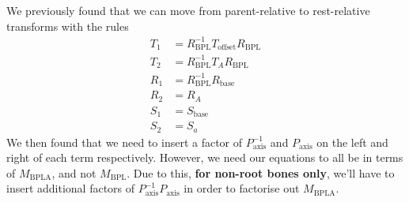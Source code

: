 \documentclass{article}
\begin{document}
We previously found that we can move from parent-relative to rest-relative transforms with the rules
\begin{align}
T_1 &= R_\mathrm{BPL}^{-1} T_\mathrm{offset} R_\mathrm{BPL}\\
T_2 &= R_\mathrm{BPL}^{-1} T_A R_\mathrm{BPL}\\
R_1 &= R_\mathrm{BPL}^{-1} R_\mathrm{base}\\
R_2 &= R_A\\
S_1 &= S_\mathrm{base}\\
S_2 &= S_a
\end{align}
We then found that we need to insert a factor of $P_\mathrm{axis}^{-1}$ and $P_\mathrm{axis}$ on the left and right of each term respectively. However, we need our equations to all be in terms of $M_\mathrm{BPLA}$, and not $M_\mathrm{BPL}$. Due to this, \textbf{for non-root bones only}, we'll have to insert additional factors of $P_\mathrm{axis}^{-1} P_\mathrm{axis}$ in order to factorise out $M_\mathrm{BPLA}$.
\end{document}
